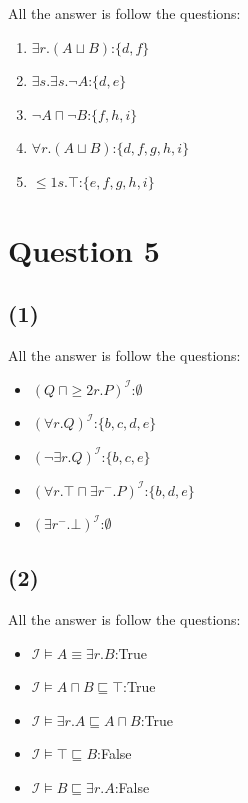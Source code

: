 \documentclass{article}
\begin{document}
	All the answer is follow the questions:

	\begin{enumerate}
		\item $\exists r.(A\sqcup B)$:$\{d,f\}$
		\item $\exists s.\exists s.\neg A$:$\{d,e\}$
		\item $\neg A\sqcap\neg B$:$\{f,h,i\}$
		\item $\forall r.(A\sqcup B)$:$\{d,f,g,h,i\}$
		\item $\leq{1}{s}.\top$:$\{e,f,g,h,i\}$
	\end{enumerate}

	\section{Question 5}

	\subsection{(1)}

	All the answer is follow the questions:
	
	\begin{itemize}
		\item $(Q~\sqcap\geq{2}{r}.P)^{\mathcal{I}}$:$\emptyset$
		\item $(\forall r.Q)^{\mathcal{I}}$:$\{b,c,d,e\}$
		\item $(\neg\exists r.Q)^{\mathcal{I}}$:$\{b,c,e\}$
		\item $(\forall r.\top\sqcap\exists r^{-}.P)^{\mathcal{I}}$:$\{b,d,e\}$
		\item $(\exists r^{-}.\bot)^{\mathcal{I}}$:$\emptyset$
	\end{itemize}

	\subsection{(2)}
	
	All the answer is follow the questions:

	\begin{itemize}
		\item $\mathcal{I}\models A\equiv\exists r.B$:True
		\item $\mathcal{I}\models A\sqcap B\sqsubseteq\top$:True
		\item $\mathcal{I}\models \exists r.A\sqsubseteq A\sqcap B$:True
		\item $\mathcal{I}\models \top\sqsubseteq B$:False
		\item $\mathcal{I}\models B\sqsubseteq\exists r.A$:False
	\end{itemize}
\end{document}
